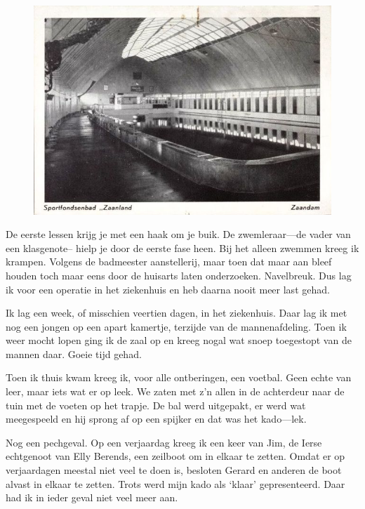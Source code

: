 \documentclass[12pt,twoside, openright]{memoir}
\begin{document}
\begin{figure}
\centering
\includegraphics[width=\textwidth]{img/77sportfondsenbad}
\end{figure}

De eerste lessen krijg je met een haak om je buik. De zwemleraar---de vader van een klasgenote-- hielp je door de eerste fase heen. Bij het alleen zwemmen kreeg ik krampen. Volgens de badmeester aanstellerij, maar toen dat maar aan bleef houden toch maar eens door de huisarts laten onderzoeken. Navelbreuk. Dus lag ik voor een operatie in het ziekenhuis en heb daarna nooit meer last gehad.

Ik lag een week, of misschien veertien dagen, in het ziekenhuis. Daar lag ik met nog een jongen op een apart kamertje, terzijde van de mannenafdeling. Toen ik weer mocht lopen ging ik de zaal op en kreeg nogal wat snoep toegestopt van de mannen daar. Goeie tijd gehad.

Toen ik thuis kwam kreeg ik, voor alle ontberingen, een voetbal. Geen echte van leer, maar iets wat er op leek. We zaten met z’n allen in de achterdeur naar de tuin met de voeten op het trapje. De bal werd uitgepakt, er werd wat meegespeeld en hij sprong af op een spijker en dat was het kado---lek. 

Nog een pechgeval. Op een verjaardag kreeg ik een keer van Jim, de Ierse echtgenoot van Elly Berends, een zeilboot om in elkaar te zetten. Omdat er op verjaardagen meestal niet veel te doen is, besloten Gerard en anderen de boot alvast in elkaar te zetten. Trots werd mijn kado als ‘klaar’ gepresenteerd. Daar had ik in ieder geval niet veel meer aan.
\end{document}
